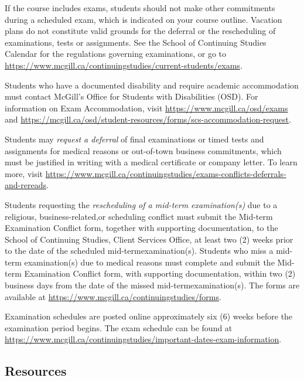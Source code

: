 \documentclass{article}
\begin{document}
If the course includes exams, students should not make other
commitments during a scheduled exam, which is indicated on your course
outline. Vacation plans do not constitute valid grounds for the
deferral or the rescheduling of examinations, tests or
assignments. See the School of Continuing Studies Calendar for the
regulations governing examinations, or go to
\url{https://www.mcgill.ca/continuingstudies/current-students/exams}.

Students who have a documented disability and require academic
accommodation must contact McGill's Office for Students with
Disabilities (OSD). For information on Exam Accommodation, visit
\url{https://www.mcgill.ca/osd/exams} and
\url{https://mcgill.ca/osd/student-resources/forms/scs-accommodation-request}.


Students may {\em request a deferral} of final examinations or timed
tests and assignments for medical reasons or out-of-town business
commitments, which must be justified in writing with a medical
certificate or company letter. To learn more, visit
\url{https://www.mcgill.ca/continuingstudies/exams-conflicts-deferrals-and-rereads}.


Students requesting the {\em rescheduling of a mid-term
  examination(s)} due to a religious, business-related,or scheduling
conflict must submit the Mid-term Examination Conflict form, together
with supporting documentation, to the School of Continuing Studies,
Client Services Office, at least two (2) weeks prior to the date of
the scheduled mid-termexamination(s). Students who miss a mid-term
examination(s) due to medical reasons must complete and submit the
Mid-term Examination Conflict form, with supporting documentation,
within two (2) business days from the date of the missed
mid-termexamination(s). The forms are available at
\url{https://www.mcgill.ca/continuingstudies/forms}.

Examination schedules are posted online approximately six (6) weeks
before the examination period begins. The exam schedule can be found
at
\url{https://www.mcgill.ca/continuingstudies/important-dates-exam-information}.

\newpage

\subsection{Resources }
\end{document}
